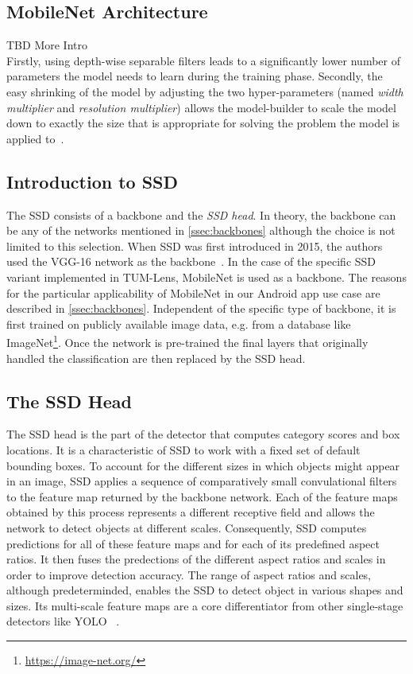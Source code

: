 \documentclass[
			   fontsize=11pt,
               paper=a4,
               bibliography=totoc,
               idxtotoc,
               headsepline,
               footsepline,
               footinclude=false,
               BCOR=12mm,
               DIV=13,
               openany,   %
               ]
               {scrbook}
\begin{document}
\subsection{MobileNet Architecture} \label{ssec:mobilenetArchitecture}
TBD More Intro \\
Firstly, using depth-wise separable filters leads to a significantly lower number of parameters the model needs to learn during the training phase. Secondly, the easy shrinking of the model by adjusting the two hyper-parameters (named \textit{width multiplier} and \textit{resolution multiplier}) allows the model-builder to scale the model down to exactly the size that is appropriate for solving the problem the model is applied to~\cite{backboneMobileNet}.

\subsection{Introduction to SSD}

The SSD consists of a backbone and the \textit{SSD head}. In theory, the backbone can be any of the networks mentioned in \autoref{ssec:backbones} although the choice is not limited to this selection. When SSD was first introduced  in 2015, the authors used the VGG-16 network as the backbone~\cite{detectorSSD}. In the case of the specific SSD variant implemented in TUM-Lens, MobileNet is used as a backbone. The reasons for the particular applicability of MobileNet in our Android app use case are described in \autoref{ssec:backbones}. Independent of the specific type of backbone, it is first trained on publicly available image data, e.g. from a database like ImageNet\footnote{\url{https://image-net.org/}}. Once the network is pre-trained the final layers that originally handled the classification are then replaced by the SSD head.

\subsection{The SSD Head}

The SSD head is the part of the detector that computes category scores and box locations. It is a characteristic of SSD to work with a fixed set of default bounding boxes. To account for the different sizes in which objects might appear in an image, SSD applies a sequence of comparatively small convulational filters to the feature map returned by the backbone network. Each of the feature maps obtained by this process represents a different receptive field and allows the network to detect objects at different scales. Consequently, SSD computes  predictions for all of these feature maps and for each of its predefined aspect ratios. It then fuses the predections of the different aspect ratios and scales in order to improve detection accuracy. The range of aspect ratios and scales, although predeterminded, enables the SSD to detect object in various shapes and sizes. Its multi-scale feature maps are a core differentiator from other single-stage detectors like YOLO~\cite{detectorSSD, detectorYOLOv1} .
\end{document}
